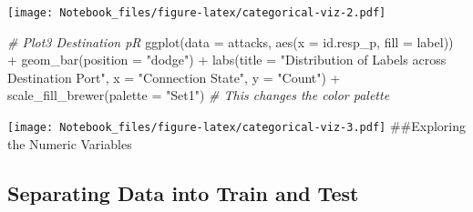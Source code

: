 \documentclass[
]{article}
\newenvironment{Shaded}{\begin{snugshade}}{\end{snugshade}}
\newcommand{\AttributeTok}[1]{\textcolor[rgb]{0.77,0.63,0.00}{#1}}
\newcommand{\CommentTok}[1]{\textcolor[rgb]{0.56,0.35,0.01}{\textit{#1}}}
\newcommand{\DecValTok}[1]{\textcolor[rgb]{0.00,0.00,0.81}{#1}}
\newcommand{\FunctionTok}[1]{\textcolor[rgb]{0.00,0.00,0.00}{#1}}
\newcommand{\NormalTok}[1]{#1}
\newcommand{\OtherTok}[1]{\textcolor[rgb]{0.56,0.35,0.01}{#1}}
\newcommand{\SpecialCharTok}[1]{\textcolor[rgb]{0.00,0.00,0.00}{#1}}
\newcommand{\StringTok}[1]{\textcolor[rgb]{0.31,0.60,0.02}{#1}}
\begin{document}
\texttt{[image: Notebook\_files/figure-latex/categorical-viz-2.pdf]}

\begin{Shaded}
\begin{Highlighting}[]
\CommentTok{\# Plot3 Destination pR}
\FunctionTok{ggplot}\NormalTok{(}\AttributeTok{data =}\NormalTok{ attacks, }\FunctionTok{aes}\NormalTok{(}\AttributeTok{x =}\NormalTok{ id.resp\_p, }\AttributeTok{fill =}\NormalTok{ label)) }\SpecialCharTok{+}
  \FunctionTok{geom\_bar}\NormalTok{(}\AttributeTok{position =} \StringTok{"dodge"}\NormalTok{) }\SpecialCharTok{+}
  \FunctionTok{labs}\NormalTok{(}\AttributeTok{title =} \StringTok{"Distribution of Labels across Destination Port"}\NormalTok{,}
       \AttributeTok{x =} \StringTok{"Connection State"}\NormalTok{,}
       \AttributeTok{y =} \StringTok{"Count"}\NormalTok{) }\SpecialCharTok{+}
  \FunctionTok{scale\_fill\_brewer}\NormalTok{(}\AttributeTok{palette =} \StringTok{"Set1"}\NormalTok{)  }\CommentTok{\# This changes the color palette}
\end{Highlighting}
\end{Shaded}

\texttt{[image: Notebook\_files/figure-latex/categorical-viz-3.pdf]}
\#\#Exploring the Numeric Variables

\begin{Shaded}
\end{Shaded}

\hypertarget{separating-data-into-train-and-test}{%
\subsection{Separating Data into Train and
Test}\label{separating-data-into-train-and-test}}
\end{document}
